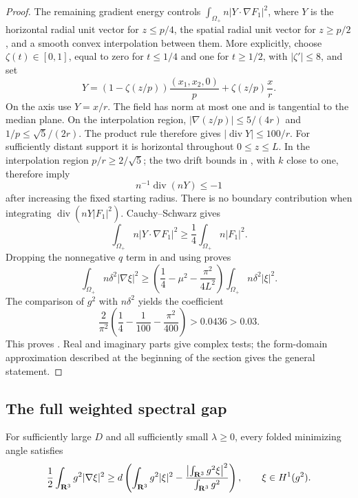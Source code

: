 \begin{proof}
The remaining gradient energy controls
\(\int_{\Omega_+}n|Y\cdot\nabla F_1|^2\), where \(Y\) is the
horizontal radial unit vector for \(z\le p/4\), the spatial radial
unit vector for \(z\ge p/2\), and a smooth convex interpolation
between them.  More explicitly, choose \(\zeta(t)\in[0,1]\), equal to
zero for \(t\le1/4\) and one for \(t\ge1/2\), with
\(|\zeta'|\le8\), and set
\[
 Y=(1-\zeta(z/p))\frac{(x_1,x_2,0)}p
            +\zeta(z/p)\frac{x}{r}.
\]
On the axis use \(Y=x/r\).  The field has norm at most one and is
tangential to the median plane.  On the interpolation region,
\(|\nabla(z/p)|\le5/(4r)\) and \(1/p\le\sqrt5/(2r)\).
The product rule therefore gives
\(\lvert\operatorname{div}Y\rvert\le100/r\).
For sufficiently distant support it is horizontal throughout
\(0\le z\le L\).  In the interpolation region \(p/r\ge2/\sqrt5\);
the two drift bounds in , with \(k\) close
to one, therefore imply
\begin{equation}\label{eq:outward-weighted-divergence}
 n^{-1}\operatorname{div}(nY)\le-1
\end{equation}
after increasing the fixed starting radius.
There is no boundary contribution when integrating
\(\operatorname{div}(nY|F_1|^2)\).  Cauchy--Schwarz gives
\[
 \int_{\Omega_+}n|Y\cdot\nabla F_1|^2
       \ge\frac14\int_{\Omega_+}n|F_1|^2.
\]
Dropping the nonnegative \(q\) term in
 and using
 proves
\[
 \int_{\Omega_+}n\delta^2|\nabla\xi|^2
 \ge\left(\frac14-\mu^2-\frac{\pi^2}{4L^2}\right)
             \int_{\Omega_+}n\delta^2|\xi|^2.
\]
The comparison of \(g^2\) with \(n\delta^2\) yields the coefficient
\begin{equation}\label{eq:exterior-gap-constant}
 \frac2{\pi^2}
 \left(\frac14-\frac1{100}-\frac{\pi^2}{400}\right)
       >0.0436>0.03.
\end{equation}
This proves .  Real and imaginary
parts give complex tests; the form-domain approximation described
at the beginning of the section gives the general statement.
\end{proof}

\subsection{The full weighted spectral gap}

\begin{proposition}
\label{prop:weighted-gap}
For sufficiently large \(D\) and all sufficiently small
\(\lambda\ge0\), every folded minimizing angle satisfies
\begin{equation}\label{eq:weighted-gap}
 \frac12\int_{\mathbf R^3}g^2|\nabla\xi|^2
 \ge d\left(
      \int_{\mathbf R^3}g^2|\xi|^2
       -\frac{\left|\int_{\mathbf R^3}g^2\xi\right|^2}
                    {\int_{\mathbf R^3}g^2}\right),
 \qquad \xi\in H^1(g^2).
\end{equation}
\end{proposition}

